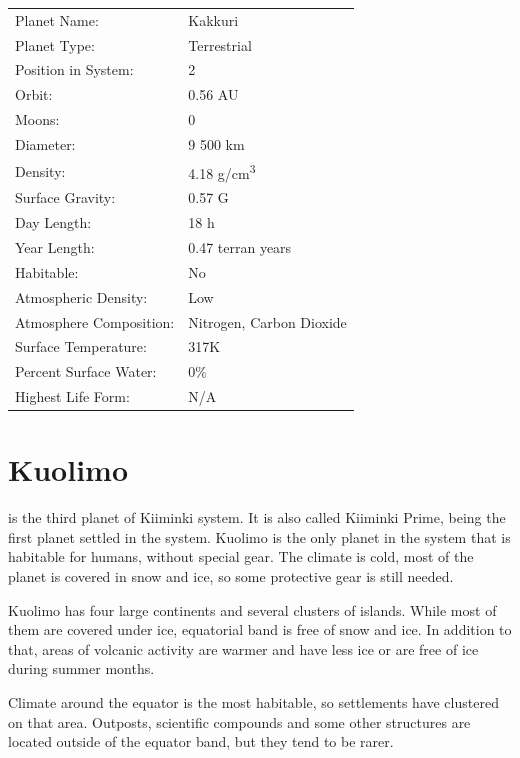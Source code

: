 \documentclass{tufte-book}
\begin{document}
\bigskip
\begin{minipage}{\textwidth}
\begin{center}
\begin{tabular}{ll}
\toprule
Planet Name: & Kakkuri \\
Planet Type: & Terrestrial \\
Position in System: & 2 \\
Orbit: & 0.56 AU \\
Moons: & 0 \\
Diameter: & 9 500 km \\
Density: & 4.18 g/cm\textsuperscript{3} \\
Surface Gravity: & 0.57 G \\
Day Length: & 18 h \\
Year Length: & 0.47 terran years \\
Habitable: & No \\
\quad Atmospheric Density: & Low \\
\quad Atmosphere Composition: & Nitrogen, Carbon Dioxide \\
\quad Surface Temperature: & 317K \\
\quad Percent Surface Water: & 0\% \\
\quad Highest Life Form: & N/A \\

\bottomrule
\end{tabular}
\end{center}
\end{minipage}

\section{Kuolimo}

 is the third planet of Kiiminki system. It is also
called Kiiminki Prime, being the first planet settled in the system.
Kuolimo is the only planet in the system that is habitable for humans,
without special gear. The climate is cold, most of the planet is covered
in snow and ice, so some protective gear is still needed.

Kuolimo has four large continents and several clusters of islands. While
most of them are covered under ice, equatorial band is free of snow and
ice. In addition to that, areas of volcanic activity are warmer and have
less ice or are free of ice during summer months.

Climate around the equator is the most habitable, so settlements have
clustered on that area. Outposts, scientific compounds and some other
structures are located outside of the equator band, but they tend to
be rarer.
\end{document}
